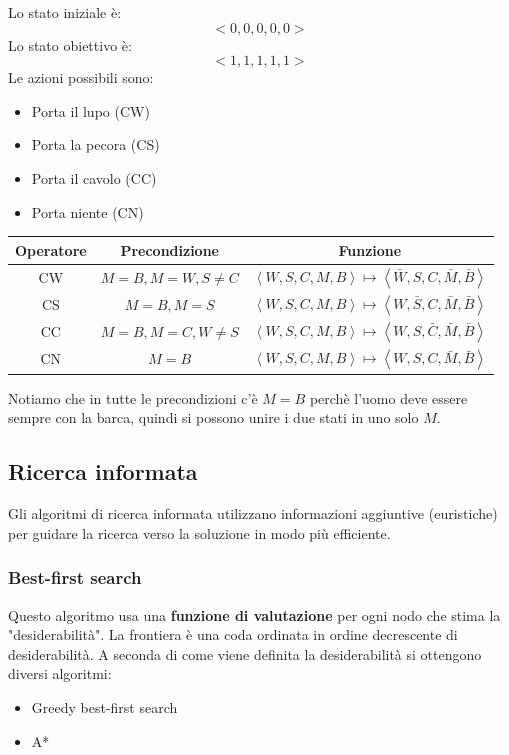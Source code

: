 \documentclass[a4paper]{article}
\begin{document}
\begin{exercise}
  Lo stato iniziale è:
  \[
    <0, 0, 0, 0, 0>
  \] 
  Lo stato obiettivo è:
  \[
    <1, 1, 1, 1, 1>
  \]
  Le azioni possibili sono:
  \begin{itemize}
    \item Porta il lupo (CW)
    \item Porta la pecora (CS)
    \item Porta il cavolo (CC)
    \item Porta niente (CN)
  \end{itemize}
  \begin{table}[H]
    \centering
    \begin{tabular}{|c|c|c|}
      \hline
      Operatore & Precondizione & Funzione \\
      \hline
      \footnotesize CW & \footnotesize \( M = B, M = W, S \neq C \) & \footnotesize\( \left<W,S,C,M,B\right> \mapsto \left<\bar{W},S,C,\bar{M},\bar{B}\right> \)\\
      \footnotesize CS & \footnotesize \( M = B, M = S \) & \footnotesize\( \left<W,S,C,M,B\right> \mapsto \left<W,\bar{S},C,\bar{M},\bar{B}\right> \)\\
      \footnotesize CC & \footnotesize \( M = B, M = C, W \neq S \) & \footnotesize\( \left<W,S,C,M,B\right> \mapsto \left<W,S,\bar{C},\bar{M},\bar{B}\right> \)\\
      \footnotesize CN & \footnotesize \( M = B \) & \footnotesize\( \left<W,S,C,M,B\right> \mapsto \left<W,S,C,\bar{M},\bar{B}\right> \)\\
      \hline
    \end{tabular}
  \end{table}
  Notiamo che in tutte le precondizioni c'è \( M = B \) perchè l'uomo deve essere
  sempre con la barca, quindi si possono unire i due stati in uno solo \( M \).
\end{exercise}

\subsection{Ricerca informata}
Gli algoritmi di ricerca informata utilizzano informazioni aggiuntive (euristiche)
per guidare la ricerca verso la soluzione in modo più efficiente.

\subsubsection{Best-first search}
Questo algoritmo usa una \textbf{funzione di valutazione} per ogni nodo che stima la
"desiderabilità". La frontiera è una coda ordinata in ordine decrescente di desiderabilità.
A seconda di come viene definita la desiderabilità si ottengono diversi algoritmi:
\begin{itemize}
  \item Greedy best-first search
  \item A*
\end{itemize}
\end{document}
